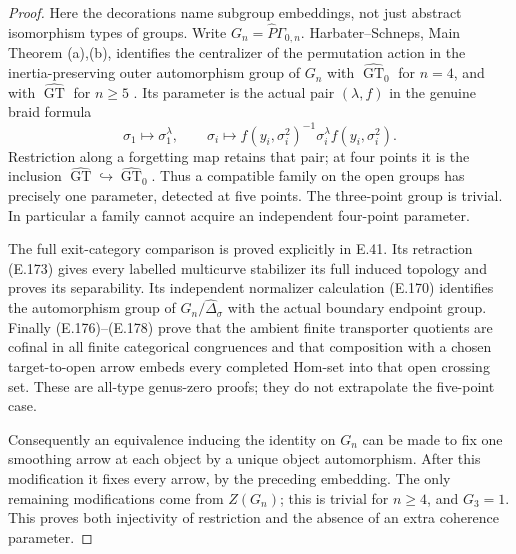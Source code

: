 \begin{proof}
Here the decorations name subgroup embeddings, not just abstract
isomorphism types of groups.  Write $G_n=\widehat P\Gamma_{0,n}$.
Harbater--Schneps, Main Theorem (a),(b), identifies the centralizer of
the permutation action in the inertia-preserving outer automorphism
group of $G_n$ with $\widehat{\operatorname{GT}}_0$ for $n=4$, and
with $\widehat{\operatorname{GT}}$ for $n\geq5$
\cite[pp.~1--3, Main Theorem]{ET_HS2000}.  Its parameter is the
actual pair $(\lambda,f)$ in the genuine braid formula
\[
 \sigma_1\longmapsto\sigma_1^\lambda,\qquad
 \sigma_i\longmapsto
 f(y_i,\sigma_i^2)^{-1}\sigma_i^\lambda f(y_i,\sigma_i^2).
                                                               \tag{E.29}
\]
Restriction along a forgetting map retains that pair; at four
points it is the inclusion
$\widehat{\operatorname{GT}}\hookrightarrow
\widehat{\operatorname{GT}}_0$.  Thus a compatible family on the
open groups has precisely one parameter, detected at five points.
The three-point group is trivial.  In particular a family cannot
acquire an independent four-point parameter.

The full exit-category comparison is proved explicitly in E.41.
Its retraction (E.173) gives every labelled multicurve stabilizer
its full induced topology and proves its separability.  Its independent
normalizer calculation (E.170) identifies the automorphism group of
$G_n/\widehat\Delta_\sigma$ with the actual boundary endpoint group.
Finally (E.176)--(E.178) prove that the ambient finite transporter
quotients are cofinal in all finite categorical congruences and that
composition with a chosen target-to-open arrow embeds every completed
Hom-set into that open crossing set.  These are all-type genus-zero
proofs; they do not extrapolate the five-point case.

Consequently an equivalence inducing the identity on $G_n$ can
be made to fix one smoothing arrow at each object by a unique
object automorphism.  After this modification it fixes every
arrow, by the preceding embedding.  The only remaining
modifications come from $Z(G_n)$; this is trivial for $n\geq4$,
and $G_3=1$.  This proves both injectivity of restriction and the
absence of an extra coherence parameter.


\end{proof}
